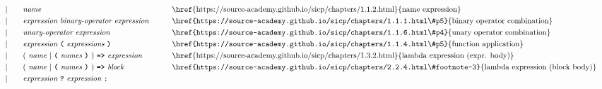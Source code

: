 \begin{alignat*}{9}
&&                       && |   &\quad &&  \textit{name}   && \textrm{\href{https://source-academy.github.io/sicp/chapters/1.1.2.html}{name expression}}\\
&&                       && |   &\quad &&  \textit{expression} \  \textit{binary-operator} \ 
                                            \textit{expression} \qquad
                                                           && \textrm{\href{https://source-academy.github.io/sicp/chapters/1.1.1.html\#p5}{binary operator combination}}\\
&&                       && |   &\quad &&   \textit{unary-operator} \ 
                                            \textit{expression}
                                                           && \textrm{\href{https://source-academy.github.io/sicp/chapters/1.1.6.html\#p4}{unary operator combination}}\\
&&                       && |   &\quad &&   \textit{expression} \ 
                                            \textbf{\texttt{(}}\ \textit{expressions}\
                                            \textbf{\texttt{)}}
                                                           && \textrm{\href{https://source-academy.github.io/sicp/chapters/1.1.4.html\#p5}{function application}}\\
&&                       && |   &\quad &&   (\ \textit{name}\ | \
                                               \textbf{\texttt{(}}\ \textit{names}\ \textbf{\texttt{)}}\
                                            )\    
                                            \texttt{\textbf{=>}}\ \textit{expression}
                                                           && \textrm{\href{https://source-academy.github.io/sicp/chapters/1.3.2.html}{lambda expression (expr. body)}}\\
&&                       && |   &\quad &&   (\ \textit{name}\ | \
                                               \textbf{\texttt{(}}\ \textit{names}\ \textbf{\texttt{)}}\
                                            )\    
                                            \texttt{\textbf{=>}}\ \textit{block}
                                                           && \textrm{\href{https://source-academy.github.io/sicp/chapters/2.2.4.html\#footnote-3}{lambda expression (block body)}}\\
&&                       && |   &\quad &&   \textit{expression} \ \textbf{\texttt{?}}\ 
                                            \textit{expression}
                                            \ \textbf{\texttt{:}}\

\end{alignat*}
